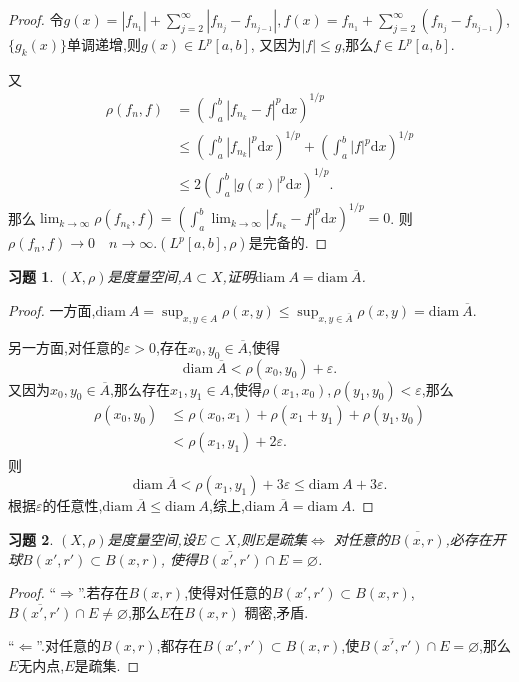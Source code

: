\documentclass[a4paper,oneside,12pt]{ctexart}
\theoremstyle{plain}
\newtheorem{exercise}{习题}
\theoremstyle{nonumberplain}
\theoremstyle{nonumberplain}
\newtheorem{proof}{证明.}
\newcommand{\dif}{\mathrm{d}}
\renewcommand{\epsilon}{\varepsilon}
\renewcommand{\emptyset}{\varnothing}
\newcommand{\abs}[1]{\left\vert#1\right\vert}
\newcommand{\diam}{\mathrm{diam\ }}
\begin{document}
\begin{proof}
    令$g(x)=\abs{f_{n_1}}+\sum_{j=2}^\infty\abs{f_{n_j}-f_{n_{j-1}}},f(x)=f_{n_1}+\sum_{j=2}^\infty(f_{n_j}-f_{n_{j-1}})$,$\{g_k(x)\}$单调递增,则$g(x)\in L^p[a,b]$,
    又因为$\abs{f}\leqslant g$,那么$f\in L^p[a,b]$.

    又
    \begin{align*}
        \rho(f_n,f)&=\left(\int_a^b\abs{f_{n_k}-f}^p\dif x\right)^{1/p}\\
        &\leqslant \left(\int_a^b\abs{f_{n_k}}^p\dif x\right)^{1/p}+\left(\int_a^b\abs{f}^p\dif x\right)^{1/p}\\
        &\leqslant 2\left(\int_a^b\abs{g(x)}^p\dif x\right)^{1/p}.
    \end{align*}
    那么$\lim_{k\to\infty}\rho(f_{n_k},f)=\left(\int_a^b \lim_{k\to\infty}\abs{f_{n_k}-f}^p\dif x\right)^{1/p}=0$.
    则$\rho(f_n,f)\to 0\quad n\to\infty$.$(L^p[a,b],\rho)$是完备的.
\end{proof}

\begin{exercise}
    \label{ex:5}
    $(X,\rho)$是度量空间,$A\subset X$,证明$\diam A=\diam \overline{A}$.
\end{exercise}

\begin{proof}
    一方面,$\diam A=\sup_{x,y\in A}\rho(x,y)\leqslant \sup_{x,y\in\overline{A}}\rho(x,y)=\diam \overline{A}$.

    另一方面,对任意的$\epsilon>0$,存在$x_0,y_0\in\overline{A}$,使得
    \begin{equation*}
        \diam \overline{A}<\rho(x_0,y_0)+\epsilon.
    \end{equation*}
    又因为$x_0,y_0\in\overline{A}$,那么存在$x_1,y_1\in A$,使得$\rho(x_1,x_0),\rho(y_1,y_0)<\epsilon$,那么 
    \begin{align*}
        \rho(x_0,y_0)&\leqslant \rho(x_0,x_1)+\rho(x_1+y_1)+\rho(y_1,y_0)\\
        &<\rho(x_1,y_1)+2\epsilon.
    \end{align*}
    则 
    \begin{equation*}
        \diam \overline{A}<\rho(x_1,y_1)+3\epsilon\leqslant \diam A+3\epsilon.
    \end{equation*}
    根据$\epsilon$的任意性,$\diam\overline{A}\leqslant\diam A$,综上,$\diam\overline{A}=\diam A$.
\end{proof}

\begin{exercise}
    \label{ex:6}
    $(X,\rho)$是度量空间,设$E\subset X$,则$E$是疏集$\Leftrightarrow$ 对任意的$\overline{B(x,r)}$,必存在开球$B(x',r')\subset B(x,r)$,
    使得$\overline{B(x',r')}\cap E=\emptyset$.
\end{exercise}

\begin{proof}
    ``$\Rightarrow$''.若存在$B(x,r)$,使得对任意的$B(x',r')\subset B(x,r)$,$\overline{B(x',r')}\cap E\neq \emptyset$,那么$E$在$B(x,r)$
    稠密,矛盾.

    ``$\Leftarrow$''.对任意的$B(x,r)$,都存在$B(x',r')\subset B(x,r)$,使$\overline{B(x',r')}\cap E=\emptyset$,那么$E$无内点,$E$是疏集.
\end{proof}
\end{document}
